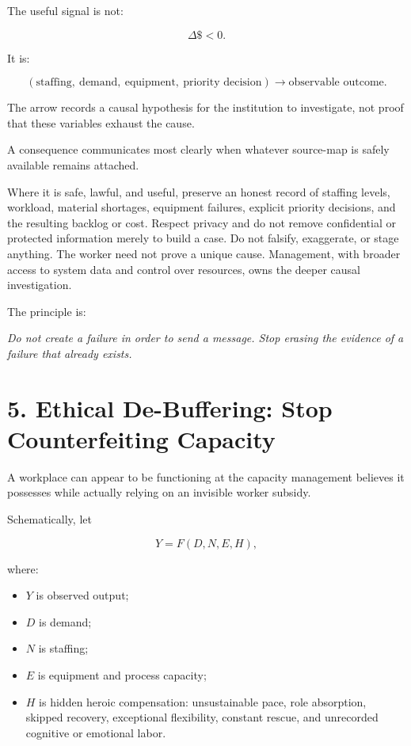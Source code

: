 \documentclass[11pt,oneside]{article}
\providecommand{\tightlist}{%
  \setlength{\itemsep}{0.22em}\setlength{\parskip}{0pt}}
\renewenvironment{quote}
  {\begin{tcolorbox}[
      enhanced,
      breakable,
      colback=ManifestLight,
      colframe=ManifestRule,
      boxrule=0pt,
      leftrule=3pt,
      arc=0pt,
      outer arc=0pt,
      left=10pt,right=10pt,top=8pt,bottom=8pt,
      before skip=0.8em,after skip=0.8em
    ]\itshape}
  {\end{tcolorbox}}
\begin{document}
The useful signal is not:

\[
\Delta \$ < 0.
\]

It is:

\[
(\text{staffing},\ \text{demand},\ \text{equipment},\ \text{priority decision})
\longrightarrow
\text{observable outcome}.
\]

The arrow records a causal hypothesis for the institution to
investigate, not proof that these variables exhaust the cause.

A consequence communicates most clearly when whatever source-map is
safely available remains attached.

Where it is safe, lawful, and useful, preserve an honest record of
staffing levels, workload, material shortages, equipment failures,
explicit priority decisions, and the resulting backlog or cost. Respect
privacy and do not remove confidential or protected information merely
to build a case. Do not falsify, exaggerate, or stage anything. The
worker need not prove a unique cause. Management, with broader access to
system data and control over resources, owns the deeper causal
investigation.

The principle is:

\begin{quote}
Do not create a failure in order to send a message. Stop erasing the
evidence of a failure that already exists.
\end{quote}

\hypertarget{ethical-de-buffering-stop-counterfeiting-capacity}{%
\section{5. Ethical De-Buffering: Stop Counterfeiting
Capacity}\label{ethical-de-buffering-stop-counterfeiting-capacity}}

A workplace can appear to be functioning at the capacity management
believes it possesses while actually relying on an invisible worker
subsidy.

Schematically, let

\[
Y = F(D,N,E,H),
\]

where:

\begin{itemize}
\tightlist
\item
  \(Y\) is observed output;
\item
  \(D\) is demand;
\item
  \(N\) is staffing;
\item
  \(E\) is equipment and process capacity;
\item
  \(H\) is hidden heroic compensation: unsustainable pace, role
  absorption, skipped recovery, exceptional flexibility, constant
  rescue, and unrecorded cognitive or emotional labor.
\end{itemize}
\end{document}
